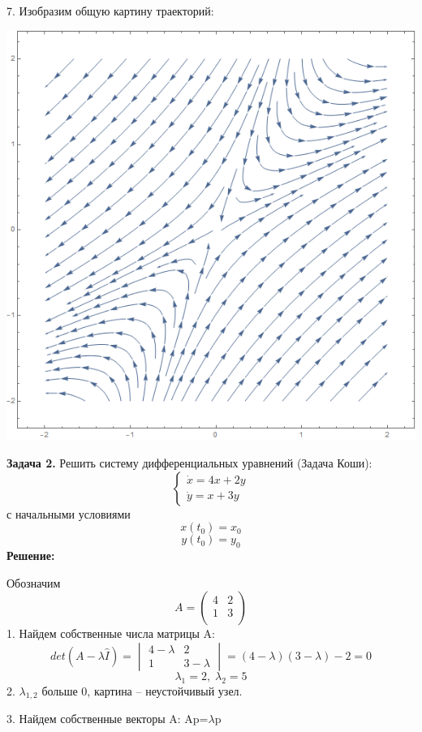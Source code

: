 \documentclass[10pt]{report}
\begin{document}
7. Изобразим общую картину траекторий:
\begin{center}
{\includegraphics[scale=0.5]{graph7.2.png}} 
\end{center}
\textbf{Задача 2.} Решить систему дифференциальных уравнений (Задача Коши): 
\begin{equation}
\left\{
\begin{array}{lr}
\dot{x} = 4x+2y\\
\dot{y} = x+3y
\end{array}
\right.
\end{equation}
с начальными условиями
\[ x(t_0)=x_0\]
\[y(t_0)=y_0\]
\textbf{Решение:} \par
Обозначим 
\[
A = \left(
\begin{array}{cc}
4 & 2\\
1 & 3\\
\end{array}
\right)\]
1. Найдем собственные числа матрицы A:
\[det(A-\lambda \hat{I})=
\begin{vmatrix}
4-\lambda & 2 \\
1 & 3-\lambda
\end{vmatrix}
=(4-\lambda)(3-\lambda)-2=0\]
\[\lambda_1=2, \; \lambda_2=5\]
2.  $\lambda_{1,2}$ больше 0, картина -- неустойчивый узел.

3. Найдем собственные векторы A: Ap=$\lambda$p
\end{document}
